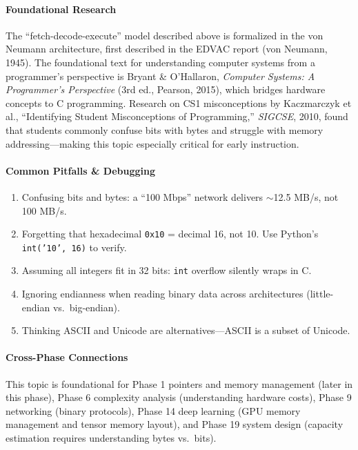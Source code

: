 \documentclass[11pt, a4paper, oneside]{report}
\begin{document}
\paragraph{Foundational Research} The ``fetch-decode-execute'' model described above is formalized in the von Neumann architecture, first described in the EDVAC report (von Neumann, 1945). The foundational text for understanding computer systems from a programmer's perspective is Bryant \& O'Hallaron, \emph{Computer Systems: A Programmer's Perspective} (3rd ed., Pearson, 2015), which bridges hardware concepts to C programming. Research on CS1 misconceptions by Kaczmarczyk et al., ``Identifying Student Misconceptions of Programming,'' \emph{SIGCSE}, 2010, found that students commonly confuse bits with bytes and struggle with memory addressing---making this topic especially critical for early instruction.


\paragraph{Common Pitfalls \& Debugging}
\begin{enumerate}[leftmargin=*]
\item Confusing bits and bytes: a ``100 Mbps'' network delivers $\sim$12.5 MB/s, not 100 MB/s.
\item Forgetting that hexadecimal \texttt{0x10} = decimal 16, not 10. Use Python's \texttt{int('10', 16)} to verify.
\item Assuming all integers fit in 32 bits: \texttt{int} overflow silently wraps in C.
\item Ignoring endianness when reading binary data across architectures (little-endian vs.\ big-endian).
\item Thinking ASCII and Unicode are alternatives---ASCII is a subset of Unicode.
\end{enumerate}

\paragraph{Cross-Phase Connections} This topic is foundational for Phase 1 pointers and memory management (later in this phase), Phase 6 complexity analysis (understanding hardware costs), Phase 9 networking (binary protocols), Phase 14 deep learning (GPU memory management and tensor memory layout), and Phase 19 system design (capacity estimation requires understanding bytes vs.\ bits).
\end{document}
